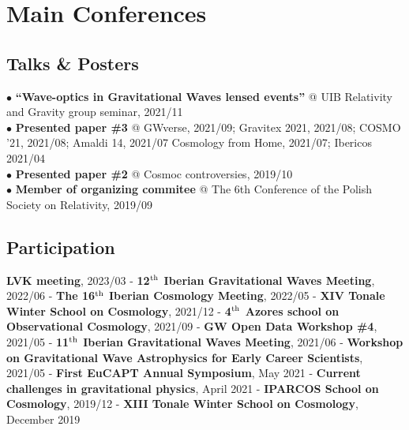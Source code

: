\documentclass[letterpaper]{twentysecondcv} %
\begin{document}
\section{Main Conferences}
\subsection{Talks \& Posters}
\iffalse
\begin{itemize}
    \item \textbf{``Wave-optics in Gravitational Waves lensed events''} @ UIB Relativity and Gravity group seminar, 2021/11 
    \item \textbf{Presented paper \#3} @ GWverse, 2021/09; 
                                         Gravitex 2021, 2021/08;
                                         COSMO '21, 2021/08;
                                         Amaldi 14, 2021/07
                                         Cosmology from Home, 2021/07;
                                         Ibericos 2021/04
    \item \textbf{Presented paper \#2} @ Cosmoc controversies, 2019/10
    \item \textbf{Member of organizing commitee} @ The 6th Conference of the Polish Society on Relativity, 2019/09
\end{itemize}
\fi
$\bullet$ \textbf{``Wave-optics in Gravitational Waves lensed events''} @ UIB Relativity and Gravity group seminar, 2021/11\\
$\bullet$ \textbf{Presented paper \#3} @ GWverse, 2021/09; 
    Gravitex 2021, 2021/08;
    COSMO '21, 2021/08;
    Amaldi 14, 2021/07
    Cosmology from Home, 2021/07;
    Ibericos 2021/04
    \\
$\bullet$ \textbf{Presented paper \#2} @ Cosmoc controversies, 2019/10\\
$\bullet$ \textbf{Member of organizing commitee} @ The 6th Conference of the Polish Society on Relativity, 2019/09


\subsection{Participation}
{\small
    \textbf{LVK meeting}, 2023/03 - 
    \textbf{12$^{\rm th}$ Iberian Gravitational Waves Meeting}, 2022/06 - 
    \textbf{The 16$^{\rm th}$ Iberian Cosmology Meeting}, 2022/05 - 
    \textbf{XIV Tonale Winter School on Cosmology}, 2021/12 - 
    \textbf{4$^{\rm th}$ Azores school on Observational Cosmology}, 2021/09 - 
    \textbf{GW Open Data Workshop \#4}, 2021/05 - 
    \textbf{11$^{\rm th}$ Iberian Gravitational Waves Meeting}, 2021/06 -  
    \textbf{Workshop on Gravitational Wave Astrophysics for Early Career Scientists}, 2021/05 - 
    \textbf{First EuCAPT Annual Symposium}, May 2021 - 
    \textbf{Current challenges in gravitational physics}, April 2021 - 
    \textbf{IPARCOS School on Cosmology}, 2019/12 - 
    \textbf{XIII Tonale Winter School on Cosmology}, December 2019
}
\end{document}
